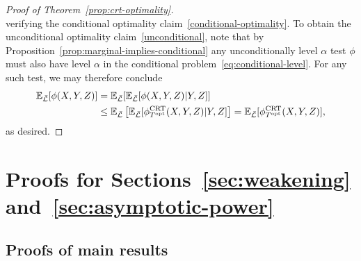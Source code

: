 \documentclass[12pt]{article}
\theoremstyle{definition}
\theoremstyle{remark}
\newcommand{\srx}{X}
\newcommand{\srz}{Z}
\newcommand{\sry}{Y}
\def\CRT{\textnormal{CRT}}
\begin{document}
\begin{proof}[Proof of Theorem~\ref{prop:crt-optimality}]
\begin{equation}
	\label{eq:likelihood-ratio-derivation}
	\end{equation}
	verifying the conditional optimality claim~\eqref{conditional-optimality}. To obtain the unconditional optimality claim~\eqref{unconditional}, note that by Proposition~\ref{prop:marginal-implies-conditional} any unconditionally level $\alpha$ test $\phi$ must also have level $\alpha$ in the conditional problem~\eqref{eq:conditional-level}. For any such test, we may therefore conclude
	\begin{equation*}
		\begin{split}
			\mathbb E_{\bar{\mathcal L}}[\phi(\srx,\sry,\srz)] &= \mathbb E_{\bar{\mathcal L}}[\mathbb E_{\bar{\mathcal L}}[\phi(\srx,\sry,\srz)|\sry,\srz]] \\
			&\leq \mathbb E_{\bar{\mathcal L}}\left[\mathbb E_{\bar{\mathcal L}}[\phi^{\CRT}_{T^\textnormal{opt}}(\srx,\sry,\srz)|\sry,\srz]\right] = \mathbb E_{\bar{\mathcal L}}[\phi^{\CRT}_{T^\textnormal{opt}}(\srx, \sry, \srz)],
		\end{split}
	\end{equation*}
as desired.
\end{proof}

\section{Proofs for Sections~\ref{sec:weakening} and~\ref{sec:asymptotic-power}} \label{sec:proofs-sec45}

\subsection{Proofs of main results}
\end{document}
